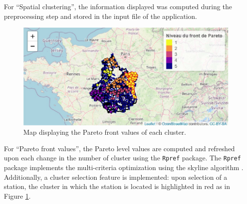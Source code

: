 For ``Spatial clustering'', the information displayed was computed during the preprocessing step and stored in the input file of the application.   

\begin{figure}[htbp]
  \centering
  \includegraphics[]{figs/Chap6/Im_appbis7.pdf}
  \caption{Map displaying the Pareto front values of each cluster.}
  \label{fig:Imapp7}
\end{figure}

For ``Pareto front values'', the Pareto level values are computed and refreshed upon each change in the number of cluster using the \texttt{Rpref} package. The \texttt{Rpref} package implements the multi-criteria optimization using the skyline algorithm \citep{914855}. Additionally, a cluster selection feature is implemented: upon selection of a station, the cluster in which the station is located is highlighted in red as in Figure \ref{fig:Imapp7}. 



